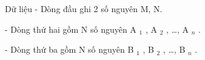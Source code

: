 Dữ liệu
- Dòng đầu ghi 2 số nguyên M, N.  

   - Dòng thứ hai gồm N số nguyên A   $_    1   $   , A   $_    2   $   , …, A   $_    n   $   .  

   - Dòng thứ ba gồm N số nguyên B   $_    1   $   , B   $_    2   $   , …, B   $_    n   $   .